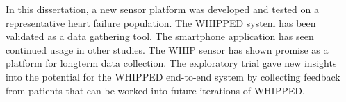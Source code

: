 In this dissertation, a new sensor platform was developed and tested on a representative heart failure population. The WHIPPED system has been validated as a data gathering tool. The smartphone application has seen continued usage in other studies. The WHIP sensor has shown promise as a platform for longterm data collection. The exploratory trial gave new insights into the potential for the WHIPPED end-to-end system by collecting feedback from patients that can be worked into future iterations of WHIPPED.

